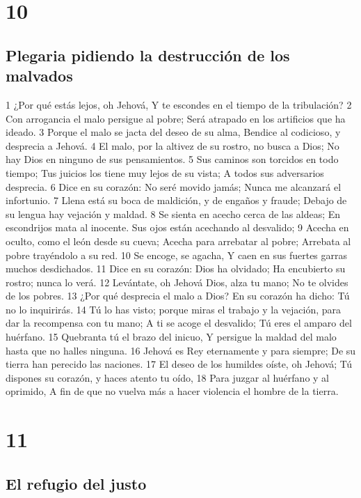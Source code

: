 \chapter{10}

\section*{Plegaria pidiendo la destrucción de los malvados}

1 ¿Por qué estás lejos, oh Jehová,
Y te escondes en el tiempo de la tribulación?
2 Con arrogancia el malo persigue al pobre;
Será atrapado en los artificios que ha ideado.
3 Porque el malo se jacta del deseo de su alma,
Bendice al codicioso, y desprecia a Jehová.
4 El malo, por la altivez de su rostro, no busca a Dios;
No hay Dios en ninguno de sus pensamientos.
5 Sus caminos son torcidos en todo tiempo;
Tus juicios los tiene muy lejos de su vista;
A todos sus adversarios desprecia.
6 Dice en su corazón: No seré movido jamás;
Nunca me alcanzará el infortunio.
7 Llena está su boca de maldición, y de engaños y fraude;
Debajo de su lengua hay vejación y maldad.
8 Se sienta en acecho cerca de las aldeas;
En escondrijos mata al inocente.
Sus ojos están acechando al desvalido;
9 Acecha en oculto, como el león desde su cueva;
Acecha para arrebatar al pobre;
Arrebata al pobre trayéndolo a su red.
10 Se encoge, se agacha,
Y caen en sus fuertes garras muchos desdichados.
11 Dice en su corazón: Dios ha olvidado;
Ha encubierto su rostro; nunca lo verá.
12 Levántate, oh Jehová Dios, alza tu mano;
No te olvides de los pobres.
13 ¿Por qué desprecia el malo a Dios?
En su corazón ha dicho: Tú no lo inquirirás.
14 Tú lo has visto; porque miras el trabajo y la vejación, para dar la recompensa con tu mano;
A ti se acoge el desvalido;
Tú eres el amparo del huérfano.
15 Quebranta tú el brazo del inicuo,
Y persigue la maldad del malo hasta que no halles ninguna.
16 Jehová es Rey eternamente y para siempre;
De su tierra han perecido las naciones.
17 El deseo de los humildes oíste, oh Jehová;
Tú dispones su corazón, y haces atento tu oído,
18 Para juzgar al huérfano y al oprimido,
A fin de que no vuelva más a hacer violencia el hombre de la tierra.

\chapter{11}

\section*{El refugio del justo}

